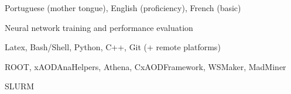 
\begin{cvskills}

{Portuguese (mother tongue), English (proficiency), French (basic)}

{Neural network training and performance evaluation}

{Latex, Bash/Shell, Python, C++, Git (+ remote platforms)}

{ROOT, xAODAnaHelpers, Athena, CxAODFramework, WSMaker, MadMiner}

{SLURM}

\end{cvskills}